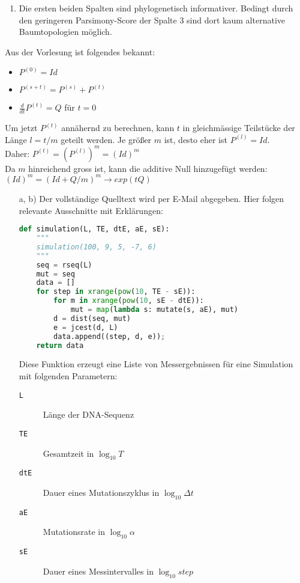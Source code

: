 \documentclass{homework}
\begin{document}
\begin{enumerate}
\begin{enumerate}
\item 

Die ersten beiden Spalten sind phylogenetisch informativer. Bedingt durch den geringeren Parsimony-Score der Spalte 3 sind dort kaum alternative Baumtopologien möglich.

\end{enumerate}


Aus der Vorlesung ist folgendes bekannt:
\begin{itemize}
	\item $P^{(0)}=Id$
	\item $P^{(s+t)}=P^{(s)}+P^{(t)}$
	\item $\frac{d}{dt}P^{(t)} = Q$ für $t=0$
\end{itemize}
Um jetzt $P^{(t)}$ annähernd zu berechnen, kann $t$ in gleichmässige Teilstücke der Länge $l = t/m$ geteilt werden.
Je größer $m$ ist, desto eher ist
$P^{(l)}=Id$.\\
Daher: $P^{(t)}=(P^{(l)})^m=(Id)^m$\\
Da $m$ hinreichend gross ist, kann die additive Null hinzugefügt werden:\\
$(Id)^m=(Id+Q/m)^m \rightarrow exp(tQ)$


\begin{enumerate}
\item[a, b)] Der vollständige Quelltext wird per E-Mail abgegeben.
Hier folgen relevante Ausschnitte mit Erklärungen:

%

\begin{lstlisting}[language=python]
def simulation(L, TE, dtE, aE, sE):
	"""
	simulation(100, 9, 5, -7, 6)
	"""
	seq = rseq(L)
	mut = seq
	data = []
	for step in xrange(pow(10, TE - sE)):
		for m in xrange(pow(10, sE - dtE)):
			mut = map(lambda s: mutate(s, aE), mut)
		d = dist(seq, mut)
		e = jcest(d, L)
		data.append((step, d, e));
	return data
\end{lstlisting}

Diese Funktion erzeugt eine Liste von Messergebnissen für eine Simulation mit
folgenden Parametern:
\begin{description}
\item[\texttt{L}] Länge der DNA-Sequenz
\item[\texttt{TE}] Gesamtzeit in $\log_{10} T$
\item[\texttt{dtE}] Dauer eines Mutationszyklus in $\log_{10} \Delta t$
\item[\texttt{aE}] Mutationsrate in $\log_{10} \alpha$
\item[\texttt{sE}] Dauer eines Messintervalles in $\log_{10} step$
\end{description}


\end{enumerate}
\end{enumerate}
\end{document}
